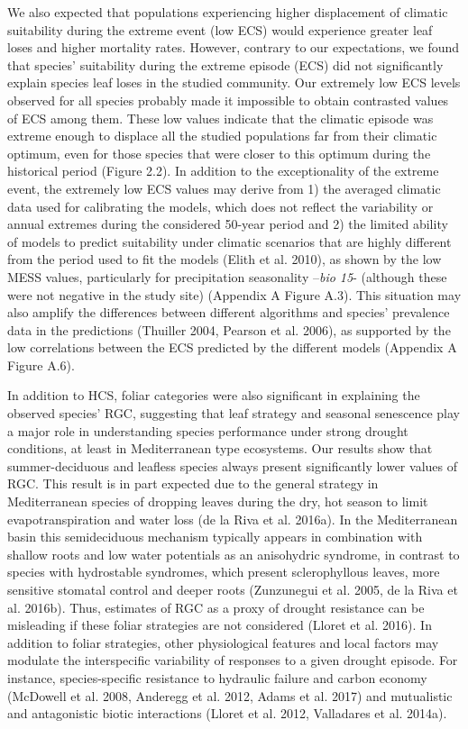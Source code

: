 \documentclass[11pt,twoside]{reedthesis}
\begin{document}
We also expected that populations experiencing higher displacement of
climatic suitability during the extreme event (low ECS) would experience
greater leaf loses and higher mortality rates. However, contrary to our
expectations, we found that species' suitability during the extreme
episode (ECS) did not significantly explain species leaf loses in the
studied community. Our extremely low ECS levels observed for all species
probably made it impossible to obtain contrasted values of ECS among
them. These low values indicate that the climatic episode was extreme
enough to displace all the studied populations far from their climatic
optimum, even for those species that were closer to this optimum during
the historical period (Figure 2.2). In addition to the exceptionality of
the extreme event, the extremely low ECS values may derive from 1) the
averaged climatic data used for calibrating the models, which does not
reflect the variability or annual extremes during the considered 50-year
period and 2) the limited ability of models to predict suitability under
climatic scenarios that are highly different from the period used to fit
the models (Elith et al. 2010), as shown by the low MESS values,
particularly for precipitation seasonality --\emph{bio 15}- (although
these were not negative in the study site) (Appendix A Figure A.3). This
situation may also amplify the differences between different algorithms
and species' prevalence data in the predictions (Thuiller 2004, Pearson
et al. 2006), as supported by the low correlations between the ECS
predicted by the different models (Appendix A Figure A.6).\par

In addition to HCS, foliar categories were also significant in
explaining the observed species' RGC, suggesting that leaf strategy and
seasonal senescence play a major role in understanding species
performance under strong drought conditions, at least in Mediterranean
type ecosystems. Our results show that summer-deciduous and leafless
species always present significantly lower values of RGC. This result is
in part expected due to the general strategy in Mediterranean species of
dropping leaves during the dry, hot season to limit evapotranspiration
and water loss (de la Riva et al. 2016a). In the Mediterranean basin
this semideciduous mechanism typically appears in combination with
shallow roots and low water potentials as an anisohydric syndrome, in
contrast to species with hydrostable syndromes, which present
sclerophyllous leaves, more sensitive stomatal control and deeper roots
(Zunzunegui et al. 2005, de la Riva et al. 2016b). Thus, estimates of
RGC as a proxy of drought resistance can be misleading if these foliar
strategies are not considered (Lloret et al. 2016). In addition to
foliar strategies, other physiological features and local factors may
modulate the interspecific variability of responses to a given drought
episode. For instance, species-specific resistance to hydraulic failure
and carbon economy (McDowell et al. 2008, Anderegg et al. 2012, Adams et
al. 2017) and mutualistic and antagonistic biotic interactions (Lloret
et al. 2012, Valladares et al. 2014a).\par
\end{document}

